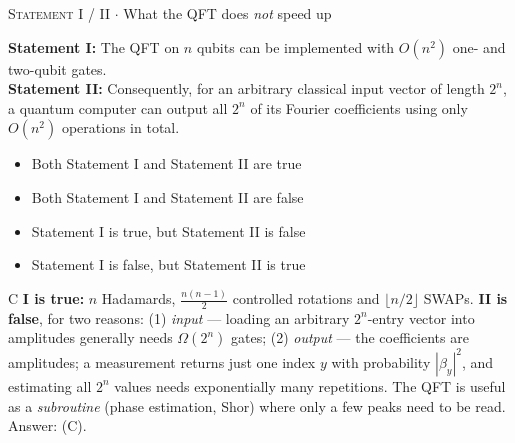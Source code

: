 \documentclass[11pt,a4paper]{article}
\newcommand{\optlabel}[1]{\textbf{(#1)}}
\newcommand{\correctlabel}[1]{\textcolor{okgreen}{\textbf{(#1)}\,\ding{51}}}
\newenvironment{qitem}[1]{\begin{list}{}{\setlength{\leftmargin}{3.3em}\setlength{\labelwidth}{3.1em}%
  \setlength{\labelsep}{0.2em}\setlength{\topsep}{3pt}\setlength{\parsep}{3pt}}\item[\textbf{Q.#1}\hfill]}{\end{list}}
\newcommand{\qsep}{\par\vspace{2pt}{\color{black!15}\hrule}\vspace{4pt}}
\newcommand{\qmeta}[2]{{\footnotesize\color{black!60}\textsc{#1} \;$\cdot$\; #2}\par}
\begin{document}
\begin{qitem}{58}
\qmeta{Statement I / II}{What the QFT does \emph{not} speed up}
\textbf{Statement I:} The QFT on $n$ qubits can be implemented with $O(n^2)$ one- and two-qubit gates.\\[1mm]
\textbf{Statement II:} Consequently, for an arbitrary classical input vector of length $2^n$, a quantum computer can output all
$2^n$ of its Fourier coefficients using only $O(n^2)$ operations in total.
\begin{itemize}[leftmargin=2.6em, labelsep=0.4em, itemsep=2pt, topsep=3pt]
\item[\optlabel{A}] Both Statement I and Statement II are true
\item[\optlabel{B}] Both Statement I and Statement II are false
\item[\correctlabel{C}] Statement I is true, but Statement II is false
\item[\optlabel{D}] Statement I is false, but Statement II is true
\end{itemize}
\end{qitem}
\begin{solbox}{C}
\textbf{I is true:} $n$ Hadamards, $\frac{n(n-1)}{2}$ controlled rotations and $\lfloor n/2\rfloor$ SWAPs.
\textbf{II is false}, for two reasons: (1) \emph{input} --- loading an arbitrary $2^n$-entry vector into amplitudes
generally needs $\Omega(2^n)$ gates; (2) \emph{output} --- the coefficients are amplitudes; a measurement returns just one
index $y$ with probability $|\beta_y|^2$, and estimating all $2^n$ values needs exponentially many repetitions.
The QFT is useful as a \emph{subroutine} (phase estimation, Shor) where only a few peaks need to be read. Answer: (C).
\end{solbox}
\qsep
\end{document}
